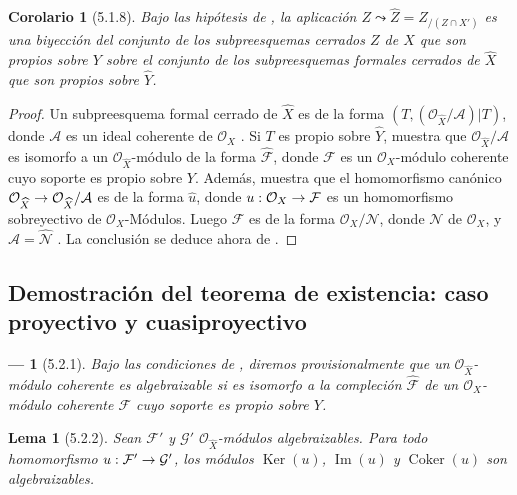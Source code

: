 \documentclass[10pt,oneside,openany]{book}
\theoremstyle{egaenv}\newtheorem*{env}{---}
\theoremstyle{egastatement}
\newtheorem*{lemma}{Lema}
\newtheorem*{corollary}{Corolario}
\theoremstyle{egadescription}
\renewcommand{\to}{\mathchoice{\longrightarrow}{\rightarrow}{\rightarrow}{\rightarrow}}
\begin{document}
\begin{corollary}[5.1.8]
\label{III.5.1.8}
\label{III.5.1.8-fr}
Bajo las hipótesis de , la aplicación
$Z\leadsto\widehat Z=Z_{/(Z\cap X')}$
es una biyección del conjunto de los subpreesquemas cerrados $Z$ de $X$
que son propios sobre $Y$ sobre el conjunto de los subpreesquemas
formales cerrados de $\widehat X$ que son propios sobre
$\widehat Y$.
\end{corollary}

\begin{proof}
Un subpreesquema formal cerrado de $\widehat X$ es de la forma
$(T,(\mathcal O_{\widehat X}/\mathcal A)|T)$,
donde $\mathcal A$ es un ideal coherente de
$\mathcal O_X$ . Si $T$ es propio sobre
$\widehat Y$,  muestra que
$\mathcal O_{\widehat X}/\mathcal A$ es isomorfo a un
$\mathcal O_{\widehat X}$-módulo de la forma
$\widehat{\mathcal F}$, donde $\mathcal F$ es un
$\mathcal O_X$-módulo coherente cuyo soporte es propio sobre $Y$. Además,
 muestra que el homomorfismo canónico
$\mathcal O_{\widehat X}\to\mathcal O_{\widehat X}/\mathcal A$
es de la forma $\widehat u$, donde
$u:\mathcal O_X\to\mathcal F$ es un homomorfismo sobreyectivo de
$\mathcal O_X$-Módulos. Luego $\mathcal F$ es de la forma
$\mathcal O_X/\mathcal N$, donde $\mathcal N$ de
$\mathcal O_X$, y
$\mathcal A=\widehat{\mathcal N}$ . La conclusión se
deduce ahora de .
\end{proof}


\subsection{Demostración del teorema de existencia: caso proyectivo y cuasiproyectivo}
\label{subsection:III.5.2}
\label{subsection:III.5.2-fr}

\begin{env}[5.2.1]
\label{III.5.2.1}
\label{III.5.2.1-fr}
Bajo las condiciones de , diremos
provisionalmente que un $\mathcal O_{\widehat X}$-módulo coherente es
\emph{algebraizable} si es isomorfo a la compleción
$\widehat{\mathcal F}$ de un $\mathcal O_X$-módulo coherente $\mathcal F$ cuyo
soporte es propio sobre $Y$.
\end{env}

\begin{lemma}[5.2.2]
\label{III.5.2.2}
\label{III.5.2.2-fr}
Sean $\mathcal F'$ y $\mathcal G'$ $\mathcal O_{\widehat X}$-módulos
algebraizables. Para todo homomorfismo
$u:\mathcal F'\to\mathcal G'$, los módulos
$\operatorname{Ker}(u)$, $\operatorname{Im}(u)$ y $\operatorname{Coker}(u)$ son
algebraizables.
\end{lemma}
\end{document}

